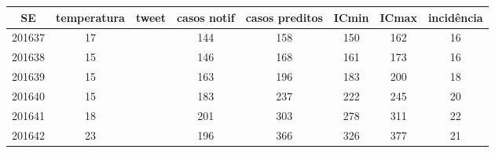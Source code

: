 \begin{tabular}{c|ccccccc}
  \hline
SE & temperatura & tweet & casos notif & casos preditos & ICmin & ICmax & incidência \\ 
  \hline
201637 & 17 &  & 144 & 158 & 150 & 162 & 16 \\ 
  201638 & 15 &  & 146 & 168 & 161 & 173 & 16 \\ 
  201639 & 15 &  & 163 & 196 & 183 & 200 & 18 \\ 
  201640 & 15 &  & 183 & 237 & 222 & 245 & 20 \\ 
  201641 & 18 &  & 201 & 303 & 278 & 311 & 22 \\ 
  201642 & 23 &  & 196 & 366 & 326 & 377 & 21 \\ 
   \hline
\end{tabular}
